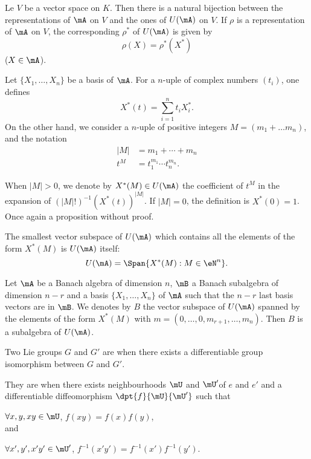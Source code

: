 \begin{proposition}
	Le $V$ be a vector space on $K$. Then there is a natural bijection between the representations of $\mA$ on $V$ and the ones of $U(\mA)$ on $V$. If $\rho$ is a representation of $\mA$ on $V$, the corresponding $\rho^*$ of $U(\mA)$ is given by
	\[
		\rho(X)=\rho^*(X^*)
	\]
	($X\in\mA$).
\end{proposition}

Let $\{X_1,\ldots,X_n\}$ be a basis of $\mA$. For a $n$-uple of complex numbers $(t_i)$, one defines
\begin{equation}
	X^*(t)=\sum_{i=1}^nt_iX^*_i.
\end{equation}
On the other hand, we consider a $n$-uple of positive integers $M=(m_1+\ldots m_n)$, and the notation
\begin{equation}
	\begin{split}
		|M|&=m_1+\cdots+m_n\\
		t^M&=t_1^{m_1}\cdots t_n^{m_n}.
	\end{split}
\end{equation}

When $|M|>0$, we denote by $X^*(M)\in U(\mA)$ the coefficient of $t^M$ in the expansion of $(|M|!)^{-1} (X^*(t))^{|M|}$. If $|M|=0$, the definition is $X^*(0)=1$. Once again a proposition without proof.

\begin{proposition}
	The smallest vector subspace of $U(\mA)$ which contains all the elements of the form $X^*(M)$ is $U(\mA)$ itself:
	\[
		U(\mA)=\Span\{ X^*(M):M\in \eN^n \}.
	\]
\end{proposition}

\begin{corollary} \label{cor:/24}
	Let $\mA$ be a Banach algebra of dimension $n$, $\mB$ a Banach subalgebra of dimension $n-r$ and a basis $\{X_1,\ldots,X_n\}$ of $\mA$ such that the $n-r$ last basis vectors are in $\mB$. We denotes by $B$ the vector subspace of $U(\mA)$ spanned by the elements of the form $X^*(M)$ with $m=(0,\ldots,0,m_{r+1},\ldots,m_n)$. Then $B$ is a subalgebra of $U(\mA)$.
\end{corollary}

\begin{definition}
	Two Lie groups $G$ and $G'$ are  when there exists a differentiable group isomorphism between $G$ and $G'$.

	They are  when there exists neighbourhoods $\mU$ and $\mU'$of $e$ and $e'$ and a differentiable diffeomorphism $\dpt{f}{\mU}{\mU'}$ such that

	$\forall x,y,xy\in\mU$, $f(xy)=f(x)f(y)$, \\and

	$\forall x',y',x'y'\in\mU'$, $f^{-1}(x'y')=f^{-1}(x')f^{-1}(y')$.
\end{definition}

